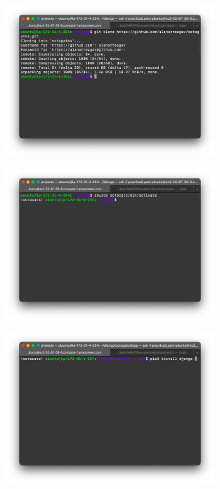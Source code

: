 \documentclass{article}
\begin{document}
\begin{enumerate}
    \begin{figure}[H]
      \centering
      \includegraphics[width=0.70\textwidth]{AppServer/i5}
    \end{figure}

    \begin{figure}[H]
      \centering
      \includegraphics[width=0.70\textwidth]{AppServer/i6}
    \end{figure}

    \begin{figure}[H]
      \centering
      \includegraphics[width=0.70\textwidth]{AppServer/i7}
    \end{figure}


\end{enumerate}
\end{document}
